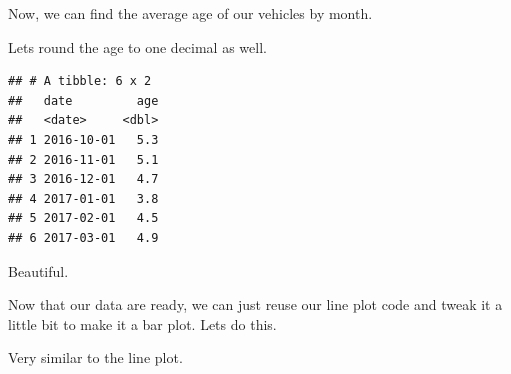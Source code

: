 \documentclass[]{book}
\newenvironment{Shaded}{\begin{snugshade}}{\end{snugshade}}
\newcommand{\CommentTok}[1]{\textcolor[rgb]{0.56,0.35,0.01}{\textit{#1}}}
\newcommand{\DataTypeTok}[1]{\textcolor[rgb]{0.13,0.29,0.53}{#1}}
\newcommand{\DecValTok}[1]{\textcolor[rgb]{0.00,0.00,0.81}{#1}}
\newcommand{\KeywordTok}[1]{\textcolor[rgb]{0.13,0.29,0.53}{\textbf{#1}}}
\newcommand{\NormalTok}[1]{#1}
\newcommand{\OperatorTok}[1]{\textcolor[rgb]{0.81,0.36,0.00}{\textbf{#1}}}
\newcommand{\StringTok}[1]{\textcolor[rgb]{0.31,0.60,0.02}{#1}}
\begin{document}
Now, we can find the average age of our vehicles by month.

\begin{Shaded}
\end{Shaded}

Lets round the age to one decimal as well.

\begin{Shaded}
\end{Shaded}

\begin{verbatim}
## # A tibble: 6 x 2
##   date         age
##   <date>     <dbl>
## 1 2016-10-01   5.3
## 2 2016-11-01   5.1
## 3 2016-12-01   4.7
## 4 2017-01-01   3.8
## 5 2017-02-01   4.5
## 6 2017-03-01   4.9
\end{verbatim}

Beautiful.

Now that our data are ready, we can just reuse our line plot code and tweak it a little bit to make it a bar plot. Lets do this.

Very similar to the line plot.
\end{document}
